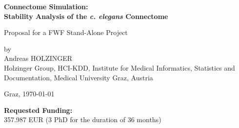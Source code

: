 \documentclass[a4paper,11pt]{article}
\begin{document}
\begin{titlepage}
\begin{center}
\bfseries\Large
Connectome Simulation:\\
Stability Analysis of the \emph{c. elegans} Connectome
\\[0,6cm]
\normalfont\normalsize

Proposal for a FWF Stand-Alone Project

by\\
Andreas HOLZINGER\\

Holzinger Group, HCI-KDD, Institute for Medical Informatics, Statistics and Documentation,
Medical University Graz, Austria
\\[0,4cm]
\vspace{0.7\baselineskip}
\begin{figure}[ht]
  \centering
\end{figure}
%
Graz, \today
%
\end{center}
\vspace{0.5\baselineskip}
\end{titlepage}
%
%
{\bf Requested Funding:}\\ 357.987 EUR (3 PhD for the duration of 36 months) 
\end{document}
